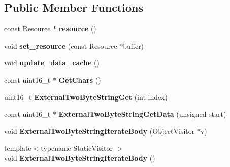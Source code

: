 \subsection*{Public Member Functions}
\begin{DoxyCompactItemize}
\item 
\hypertarget{classv8_1_1internal_1_1_external_two_byte_string_ab264ae7edf3e8a176f700425292a6b51}{}const Resource $\ast$ {\bfseries resource} ()\label{classv8_1_1internal_1_1_external_two_byte_string_ab264ae7edf3e8a176f700425292a6b51}

\item 
\hypertarget{classv8_1_1internal_1_1_external_two_byte_string_a672e75f8c2877dca940d6a06ccfb7adf}{}void {\bfseries set\+\_\+resource} (const Resource $\ast$buffer)\label{classv8_1_1internal_1_1_external_two_byte_string_a672e75f8c2877dca940d6a06ccfb7adf}

\item 
\hypertarget{classv8_1_1internal_1_1_external_two_byte_string_adf35077c4982dd62d5e86d3bb098a8f3}{}void {\bfseries update\+\_\+data\+\_\+cache} ()\label{classv8_1_1internal_1_1_external_two_byte_string_adf35077c4982dd62d5e86d3bb098a8f3}

\item 
\hypertarget{classv8_1_1internal_1_1_external_two_byte_string_aa22bc19a94d3ee8f88e11a6e7b6302c0}{}const uint16\+\_\+t $\ast$ {\bfseries Get\+Chars} ()\label{classv8_1_1internal_1_1_external_two_byte_string_aa22bc19a94d3ee8f88e11a6e7b6302c0}

\item 
\hypertarget{classv8_1_1internal_1_1_external_two_byte_string_a0c20e537dbe5a24ae5ef7228291c4d6c}{}uint16\+\_\+t {\bfseries External\+Two\+Byte\+String\+Get} (int index)\label{classv8_1_1internal_1_1_external_two_byte_string_a0c20e537dbe5a24ae5ef7228291c4d6c}

\item 
\hypertarget{classv8_1_1internal_1_1_external_two_byte_string_a2d7f982e7a525a42261b0e9696e35991}{}const uint16\+\_\+t $\ast$ {\bfseries External\+Two\+Byte\+String\+Get\+Data} (unsigned start)\label{classv8_1_1internal_1_1_external_two_byte_string_a2d7f982e7a525a42261b0e9696e35991}

\item 
\hypertarget{classv8_1_1internal_1_1_external_two_byte_string_a82744449074cdaa0b6e581a7a826a63e}{}void {\bfseries External\+Two\+Byte\+String\+Iterate\+Body} (Object\+Visitor $\ast$v)\label{classv8_1_1internal_1_1_external_two_byte_string_a82744449074cdaa0b6e581a7a826a63e}

\item 
\hypertarget{classv8_1_1internal_1_1_external_two_byte_string_ada2899c76f0d3e2ff0b3d67a4ca7aef5}{}{\footnotesize template$<$typename Static\+Visitor $>$ }\\void {\bfseries External\+Two\+Byte\+String\+Iterate\+Body} ()\label{classv8_1_1internal_1_1_external_two_byte_string_ada2899c76f0d3e2ff0b3d67a4ca7aef5}

\end{DoxyCompactItemize}
